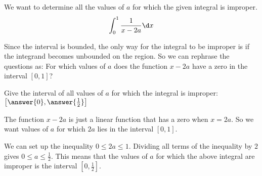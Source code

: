 \documentclass{ximera}
\author{Jason Miller}
\begin{document}
\begin{exercise}
We want to determine all the values of $a$ for which the given integral is improper. 
\[
\int_{0}^{1} \frac{1}{x-2a} \d x
\]



Since the interval is bounded, the only way for the integral to be improper is if the integrand becomes unbounded on the region. So we can rephrase the questions as:
For which values of $a$ does the function $x-2a$ have a zero in the interval $[0,1]$? 


Give the interval of all values of $a$ for which the integral is improper:$\left[ \answer{0}, \answer{\frac{1}{2}} \right]$


\begin{feedback}[correct]

The function $x-2a$ is just a linear function that has a zero when $x=2a$. So we want values of $a$ for which $2a$ lies in the interval $[0,1]$.

 We can set up the inequality $0\leq 2a \leq 1$. Dividing all terms of the inequality by $2$ gives $0 \leq a \leq \frac{1}{2}$. This means that the values of $a$ for which the above integral are improper is the interval $\left[0, \frac{1}{2} \right]$. 
\end{feedback}


\end{exercise}
\end{document}
